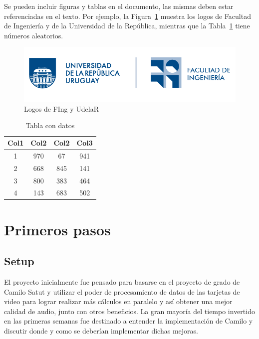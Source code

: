\documentclass{prgrado}
\begin{document}
Se pueden incluir figuras y tablas en el documento, las mismas deben estar referenciadas en el texto. Por ejemplo, la Figura~\ref{fig:logos} muestra los logos de Facultad de Ingeniería y de la Universidad de la República, mientras que la Tabla~\ref{table:datos} tiene números aleatorios.

\begin{figure}[h!]
    \centering
    \includegraphics[width=\textwidth]{figs/logo-udelar-fing.png}
    \caption{Logos de FIng y UdelaR}
    \label{fig:logos}
\end{figure}

\begin{table}[h!]
\centering
\begin{tabular}{| c | c | c | c |} 
 \hline
 Col1 & Col2 & Col2 & Col3 \\  
 \hline
 1 & 970 & 67 & 941 \\ 
 2 & 668 & 845 & 141 \\
 3 & 800 & 383 & 464 \\
 4 & 143 & 683 & 502 \\
 \hline
\end{tabular}
\caption{Tabla con datos}
\label{table:datos}
\end{table}


\chapter{Primeros pasos}

\section{Setup}

El proyecto inicialmente fue pensado para basarse en el proyecto de grado de Camilo Satut y utilizar el poder de procesamiento de datos de las tarjetas de video para lograr realizar más cálculos en paralelo y así obtener una mejor calidad de audio, junto con otros beneficios. La gran mayoría del tiempo invertido en las primeras semanas fue destinado a entender la implementación de Camilo y discutir donde y como se deberían implementar dichas mejoras.
\end{document}
